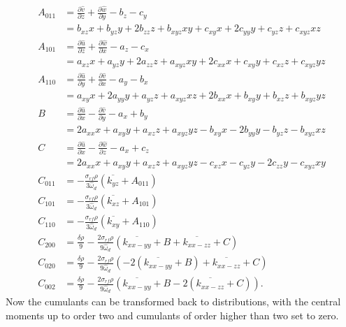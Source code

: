 \begin{align}
	A_{011} &= \frac{\partial \hat{v}}{\partial z} + \frac{\partial \hat{w}}{\partial y} - b_z - c_y \\
	&= b_{xz} x + b_{yz} y + 2 b_{zz} z + b_{xyz} xy + c_{xy} x + 2 c_{yy} y + c_{yz} z + c_{xyz} xz \\
	A_{101} &= \frac{\partial \hat{u}}{\partial z} + \frac{\partial \hat{w}}{\partial x} - a_z - c_x \\
	&= a_{xz} x + a_{yz} y + 2 a_{zz} z + a_{xyz} xy + 2 c_{xx} x + c_{xy} y + c_{xz} z + c_{xyz} yz \\
	A_{110} &= \frac{\partial \hat{u}}{\partial y} + \frac{\partial \hat{v}}{\partial x} - a_y - b_x \\
	&= a_{xy} x + 2 a_{yy} y + a_{yz} z + a_{xyz} xz + 2 b_{xx} x + b_{xy} y + b_{xz} z + b_{xyz} yz \\
	B &= \frac{\partial \hat{u}}{\partial x} - \frac{\partial \hat{v}}{\partial y} - a_x + b_y \\
	&= 2 a_{xx} x + a_{xy} y + a_{xz} z + a_{xyz} yz - b_{xy} x - 2 b_{yy} y - b_{yz} z - b_{xyz} xz \\
	C &= \frac{\partial \hat{u}}{\partial x} - \frac{\partial \hat{w}}{\partial z} - a_x + c_z \\
	&= 2 a_{xx} x + a_{xy} y + a_{xz} z + a_{xyz} yz - c_{xz} x - c_{yz} y - 2 c_{zz} y - c_{xyz} xy\\
	C_{011} &= - \frac{\sigma_{rf} \rho}{3 \hat{\omega}_d} \left( \overline{k_{yz}} + A_{011} \right)\\
	C_{101} &= - \frac{\sigma_{rf} \rho}{3 \hat{\omega}_d} \left( \overline{k_{xz}} + A_{101} \right) \\
	C_{110} &= - \frac{\sigma_{rf} \rho}{3 \hat{\omega}_d} \left( \overline{k_{xy}} + A_{110} \right) \\
	C_{200} &= \frac{\delta \rho}{9} - \frac{2 \sigma_{rf} \rho}{9 \hat{\omega}_d} \left( \overline{k_{xx-yy}} + B + \overline{k_{xx-zz}} + C \right) \\
	C_{020} &= \frac{\delta \rho}{9} - \frac{2 \sigma_{rf} \rho}{9 \hat{\omega}_d} \left( -2 \left(\overline{k_{xx-yy}} + B\right) + \overline{k_{xx-zz}} + C \right) \\
	C_{002} &= \frac{\delta \rho}{9} - \frac{2 \sigma_{rf} \rho}{9 \hat{\omega}_d} \left( \overline{k_{xx-yy}} + B - 2 \left( \overline{k_{xx-zz}} + C \right) \right).		
\end{align}
Now the cumulants can be transformed back to distributions, with the central moments up to order two and cumulants of order higher than two set to zero. 